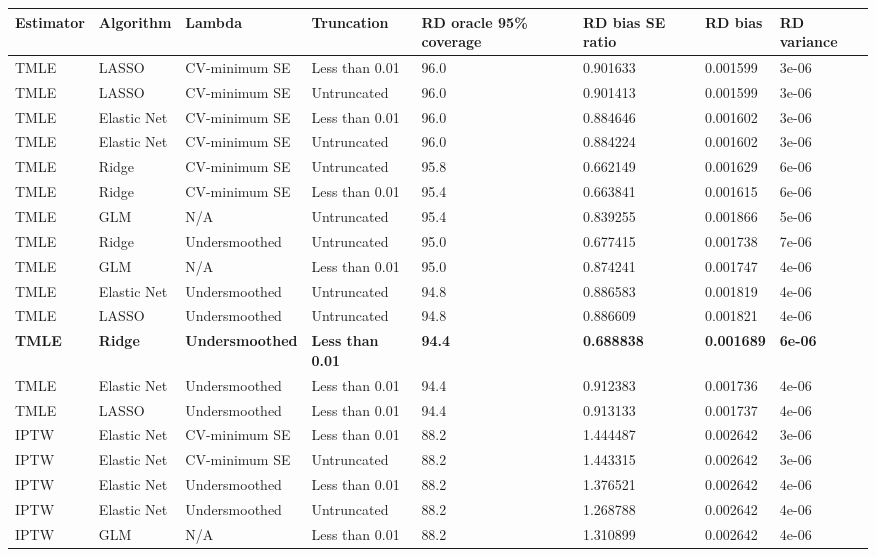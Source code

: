 
\begin{longtable}[l]{llllllll}
\toprule
Estimator & Algorithm & Lambda & Truncation & RD oracle 95\% coverage & RD bias SE ratio & RD bias & RD variance\\
\midrule
TMLE & LASSO & CV-minimum SE & Less than 0.01 & 96.0 & 0.901633 & 0.001599 & 3e-06\\
TMLE & LASSO & CV-minimum SE & Untruncated & 96.0 & 0.901413 & 0.001599 & 3e-06\\
TMLE & Elastic Net & CV-minimum SE & Less than 0.01 & 96.0 & 0.884646 & 0.001602 & 3e-06\\
TMLE & Elastic Net & CV-minimum SE & Untruncated & 96.0 & 0.884224 & 0.001602 & 3e-06\\
TMLE & Ridge & CV-minimum SE & Untruncated & 95.8 & 0.662149 & 0.001629 & 6e-06\\
TMLE & Ridge & CV-minimum SE & Less than 0.01 & 95.4 & 0.663841 & 0.001615 & 6e-06\\
TMLE & GLM & N/A & Untruncated & 95.4 & 0.839255 & 0.001866 & 5e-06\\
TMLE & Ridge & Undersmoothed & Untruncated & 95.0 & 0.677415 & 0.001738 & 7e-06\\
TMLE & GLM & N/A & Less than 0.01 & 95.0 & 0.874241 & 0.001747 & 4e-06\\
TMLE & Elastic Net & Undersmoothed & Untruncated & 94.8 & 0.886583 & 0.001819 & 4e-06\\
TMLE & LASSO & Undersmoothed & Untruncated & 94.8 & 0.886609 & 0.001821 & 4e-06\\
\midrule
\textbf{TMLE} & \textbf{Ridge} & \textbf{Undersmoothed} & \textbf{Less than 0.01} & \textbf{94.4} & \textbf{0.688838} & \textbf{0.001689} & \textbf{6e-06}\\
\midrule
TMLE & Elastic Net & Undersmoothed & Less than 0.01 & 94.4 & 0.912383 & 0.001736 & 4e-06\\
TMLE & LASSO & Undersmoothed & Less than 0.01 & 94.4 & 0.913133 & 0.001737 & 4e-06\\
IPTW & Elastic Net & CV-minimum SE & Less than 0.01 & 88.2 & 1.444487 & 0.002642 & 3e-06\\
IPTW & Elastic Net & CV-minimum SE & Untruncated & 88.2 & 1.443315 & 0.002642 & 3e-06\\
IPTW & Elastic Net & Undersmoothed & Less than 0.01 & 88.2 & 1.376521 & 0.002642 & 4e-06\\
IPTW & Elastic Net & Undersmoothed & Untruncated & 88.2 & 1.268788 & 0.002642 & 4e-06\\
IPTW & GLM & N/A & Less than 0.01 & 88.2 & 1.310899 & 0.002642 & 4e-06\\

\end{longtable}
